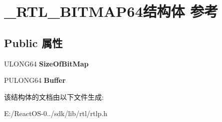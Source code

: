 \hypertarget{struct___r_t_l___b_i_t_m_a_p64}{}\section{\+\_\+\+R\+T\+L\+\_\+\+B\+I\+T\+M\+A\+P64结构体 参考}
\label{struct___r_t_l___b_i_t_m_a_p64}
\subsection*{Public 属性}
\begin{DoxyCompactItemize}
\item 
\mbox{\label{struct___r_t_l___b_i_t_m_a_p64_afb1bd9e0dd49713a78f3d12b9075a16b}} 
U\+L\+O\+N\+G64 {\bfseries Size\+Of\+Bit\+Map}
\item 
\mbox{\label{struct___r_t_l___b_i_t_m_a_p64_a8a8f32973f3e87e3214c77329c341eae}} 
P\+U\+L\+O\+N\+G64 {\bfseries Buffer}
\end{DoxyCompactItemize}


该结构体的文档由以下文件生成\+:\begin{DoxyCompactItemize}
\item 
E\+:/\+React\+O\+S-\/0../sdk/lib/rtl/rtlp.\+h\end{DoxyCompactItemize}
